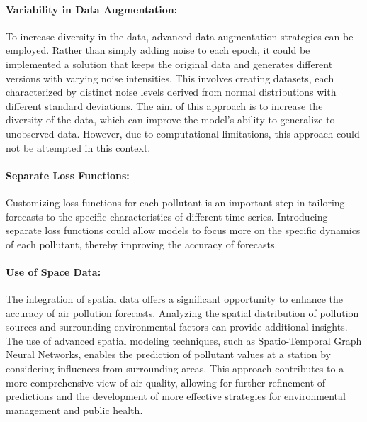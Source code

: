 \paragraph{Variability in Data Augmentation:}
To increase diversity in the data, advanced data augmentation strategies can be employed. Rather than simply adding noise to each epoch, it could be implemented a solution that keeps the original data and generates different versions with varying noise intensities. This involves creating datasets, each characterized by distinct noise levels derived from normal distributions with different standard deviations. The aim of this approach is to increase the diversity of the data, which can improve the model's ability to generalize to unobserved data. However, due to computational limitations, this approach could not be attempted in this context.

\paragraph{Separate Loss Functions:}
Customizing loss functions for each pollutant is an important step in tailoring forecasts to the specific characteristics of different time series. Introducing separate loss functions could allow models to focus more on the specific dynamics of each pollutant, thereby improving the accuracy of forecasts.


\paragraph{Use of Space Data:}
The integration of spatial data offers a significant opportunity to enhance the accuracy of air pollution forecasts. Analyzing the spatial distribution of pollution sources and surrounding environmental factors can provide additional insights. The use of advanced spatial modeling techniques, such as Spatio-Temporal Graph Neural Networks, enables the prediction of pollutant values at a station by considering influences from surrounding areas. This approach contributes to a more comprehensive view of air quality, allowing for further refinement of predictions and the development of more effective strategies for environmental management and public health.





